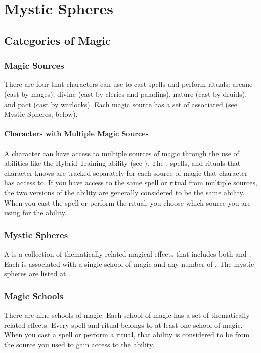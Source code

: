 \chapter{Mystic Spheres}\label{Mystic Spheres}

\section{Categories of Magic}

    \subsection{Magic Sources}
        There are four  that characters can use to cast spells and perform rituals: arcane (cast by mages), divine (cast by clerics and paladins), nature (cast by druids), and pact (cast by warlocks).
        Each magic source has a set of associated  (see Mystic Spheres, below).

        \subsubsection{Characters with Multiple Magic Sources}
            A character can have access to multiple sources of magic through the use of abilities like the Hybrid Training ability (see ).
            The , spells, and rituals that character knows are tracked separately for each source of magic that character has access to.
            If you have access to the same spell or ritual from multiple sources, the two versions of the ability are generally considered to be the same ability.
            When you cast the spell or perform the ritual, you choose which source you are using for the ability.

    \subsection{Mystic Spheres}
        A  is a collection of thematically related magical effects that includes both  and .
        Each  is associated with a single school of magic and any number of .
        The mystic spheres are listed at .

    \subsection{Magic Schools}
        There are nine schools of magic.
        Each school of magic has a set of thematically related effects.
        Every spell and ritual belongs to at least one school of magic.
        When you cast a spell or perform a ritual, that ability is considered to be from the source you used to gain access to the ability.


